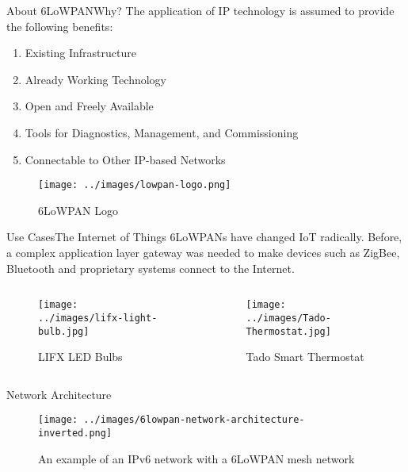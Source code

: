 \documentclass[10pt]{beamer}
\begin{document}
\begin{frame}{About 6LoWPAN}{Why?}
    The application of IP technology is assumed to provide the following benefits\cite{rfc4919}:
    \begin{enumerate}
        \item Existing Infrastructure
        \item Already Working Technology
        \item Open and Freely Available
        \item Tools for Diagnostics, Management, and Commissioning
        \item Connectable to Other IP-based Networks
    \end{enumerate}

    \begin{figure}[htpb]
        \centering
        \texttt{[image: ../images/lowpan-logo.png]}
        \caption{6LoWPAN Logo}
    \end{figure}
\end{frame}

\begin{frame}{Use Cases}{The Internet of Things}
    6LoWPANs have changed IoT radically. Before, a complex application layer gateway was needed to make devices such as ZigBee, Bluetooth and proprietary systems connect to the Internet.\cite{olsson20146lowpan}

    \begin{columns}
        \begin{column}{0.5\textwidth}
            \begin{figure}[htpb]
                \centering
                \texttt{[image: ../images/lifx-light-bulb.jpg]}
                \caption{LIFX LED Bulbs\cite{LIFX}}
            \end{figure}
        \end{column}
        \begin{column}{0.5\textwidth}
            \begin{figure}[htpb]
                \centering
                \texttt{[image: ../images/Tado-Thermostat.jpg]}
                \caption{Tado Smart Thermostat\cite{tado-Smart-Thermostat}}
            \end{figure}
        \end{column}
    \end{columns}
\end{frame}

\begin{frame}{Network Architecture}
    \begin{figure}[htpb]
        \centering
        \texttt{[image: ../images/6lowpan-network-architecture-inverted.png]}
        \caption{An example of an IPv6 network with a 6LoWPAN mesh network\cite{olsson20146lowpan}}
    \end{figure}
\end{frame}
\end{document}
